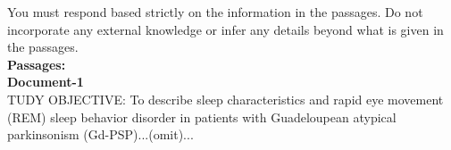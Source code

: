 \documentclass[10pt, a4paper, logo]{googledeepmind} %
\begin{document}
\begin{tcolorbox}[
    enhanced,
    breakable,
    colback=promptpurple,            %
    colframe=bordergray,           %
    boxrule=1pt,                   %
    sharp corners,                 %
]
\begin{flushleft}
You must respond based strictly on the information in the passages. Do not incorporate any external knowledge or infer any details beyond what is given in the passages.
\\
\vspace{1em}
\textbf{Passages:}\\
\textbf{Document-1}\\
TUDY OBJECTIVE: To describe sleep characteristics and rapid eye movement (REM) sleep behavior disorder in patients with Guadeloupean atypical parkinsonism (Gd-PSP)...(omit)...

\end{flushleft}
\end{tcolorbox}
\end{document}
